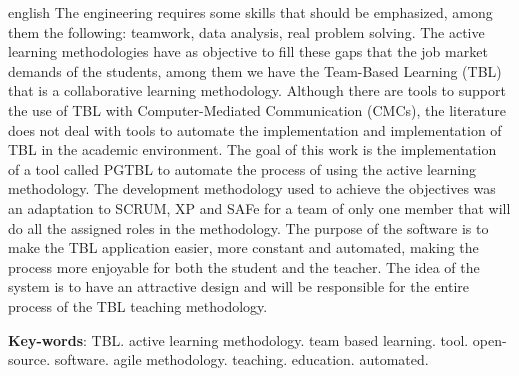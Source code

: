 \begin{resumo}[Abstract]
 \begin{otherlanguage*}{english}
   The engineering requires some skills that should be emphasized, among them the following: teamwork, data analysis, real problem solving. The active learning methodologies have as objective to fill these gaps that the job market demands of the students, among them we have the Team-Based Learning (TBL) that is a collaborative learning methodology. Although there are tools to support the use of TBL with Computer-Mediated Communication (CMCs), the literature does not deal with tools to automate the implementation and implementation of TBL in the academic environment. The goal of this work is the implementation of a tool called PGTBL to automate the process of using the active learning methodology. The development methodology used to achieve the objectives was an adaptation to SCRUM, XP and SAFe for a team of only one member that will do all the assigned roles in the methodology. The purpose of the software is to make the TBL application easier, more constant and automated, making the process more enjoyable for both the student and the teacher. The idea of the system is to have an attractive design and will be responsible for the entire process of the TBL teaching methodology.

   \vspace{\onelineskip}

   \noindent
   \textbf{Key-words}: TBL. active learning methodology. team based learning. tool. open-source. software. agile
   methodology. teaching. education. automated.
 \end{otherlanguage*}
\end{resumo}
